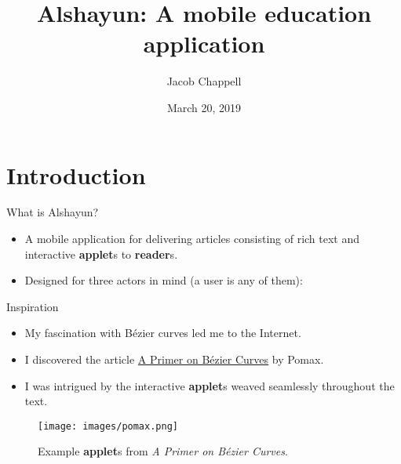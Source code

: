 \documentclass{beamer}
\title{Alshayun: A mobile education application}
\date{March 20, 2019}
\author{Jacob Chappell}
\institute{University of Kentucky}
\begin{document}
\maketitle

\section{Introduction}

\begin{frame}{What is Alshayun?}
    \begin{itemize}
        \item A mobile application for delivering articles consisting of rich
            text and interactive \textbf{applet}s to \textbf{reader}s.
        \item Designed for three actors in mind (a user is any of them):
    \end{itemize}
\end{frame}

\begin{frame}{Inspiration}
    \begin{itemize}
        \item My fascination with Bézier curves led me to the Internet.
        \item I discovered the article
            \href{https://pomax.github.io/bezierinfo/}{A Primer on Bézier
            Curves} by Pomax.
        \item I was intrigued by the interactive \textbf{applet}s weaved
            seamlessly throughout the text.
    \end{itemize}
    \begin{figure}
        \begin{center}
            \texttt{[image: images/pomax.png]}
        \end{center}
        \caption{Example \textbf{applet}s from \textit{A Primer on Bézier
        Curves}.}
    \end{figure}
\end{frame}
\end{document}
